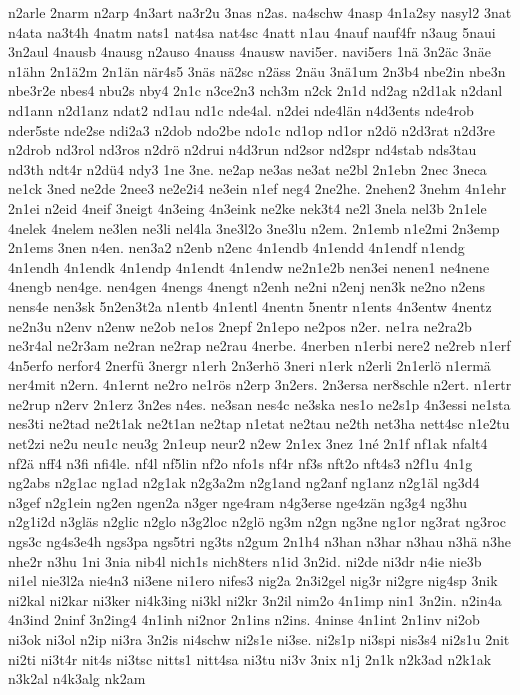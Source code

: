 {n2arle
2narm
n2arp
4n3art
na3r2u
3nas
n2as.
na4schw
4nasp
4n1a2sy
nasyl2
3nat
n4ata
na3t4h
4natm
nats1
nat4sa
nat4sc
4natt
n1au
4nauf
nauf4fr
n3aug
5naui
3n2aul
4nausb
4nausg
n2auso
4nauss
4nausw
navi5er.
navi5ers
1nä
3n2äc
3näe
n1ähn
2n1ä2m
2n1än
när4s5
3näs
nä2sc
n2äss
2näu
3nä1um
2n3b4
nbe2in
nbe3n
nbe3r2e
nbes4
nbu2s
nby4
2n1c
n3ce2n3
nch3m
n2ck
2n1d
nd2ag
n2d1ak
n2danl
nd1ann
n2d1anz
ndat2
nd1au
nd1c
nde4al.
n2dei
nde4län
n4d3ents
nde4rob
nder5ste
nde2se
ndi2a3
n2dob
ndo2be
ndo1c
nd1op
nd1or
n2dö
n2d3rat
n2d3re
n2drob
nd3rol
nd3ros
n2drö
n2drui
n4d3run
nd2sor
nd2spr
nd4stab
nds3tau
nd3th
ndt4r
n2dü4
ndy3
1ne
3ne.
ne2ap
ne3as
ne3at
ne2bl
2n1ebn
2nec
3neca
ne1ck
3ned
ne2de
2nee3
ne2e2i4
ne3ein
n1ef
neg4
2ne2he.
2nehen2
3nehm
4n1ehr
2n1ei
n2eid
4neif
3neigt
4n3eing
4n3eink
ne2ke
nek3t4
ne2l
3nela
nel3b
2n1ele
4nelek
4nelem
ne3len
ne3li
nel4la
3ne3l2o
3ne3lu
n2em.
2n1emb
n1e2mi
2n3emp
2n1ems
3nen
n4en.
nen3a2
n2enb
n2enc
4n1endb
4n1endd
4n1endf
n1endg
4n1endh
4n1endk
4n1endp
4n1endt
4n1endw
ne2n1e2b
nen3ei
nenen1
ne4nene
4nengb
nen4ge.
nen4gen
4nengs
4nengt
n2enh
ne2ni
n2enj
nen3k
ne2no
n2ens
nens4e
nen3sk
5n2en3t2a
n1entb
4n1entl
4nentn
5nentr
n1ents
4n3entw
4nentz
ne2n3u
n2env
n2enw
ne2ob
ne1os
2nepf
2n1epo
ne2pos
n2er.
ne1ra
ne2ra2b
ne3r4al
ne2r3am
ne2ran
ne2rap
ne2rau
4nerbe.
4nerben
n1erbi
nere2
ne2reb
n1erf
4n5erfo
nerfor4
2nerfü
3nergr
n1erh
2n3erhö
3neri
n1erk
n2erli
2n1erlö
n1ermä
ner4mit
n2ern.
4n1ernt
ne2ro
ne1rös
n2erp
3n2ers.
2n3ersa
ner8schle
n2ert.
n1ertr
ne2rup
n2erv
2n1erz
3n2es
n4es.
ne3san
nes4c
ne3ska
nes1o
ne2s1p
4n3essi
ne1sta
nes3ti
ne2tad
ne2t1ak
ne2t1an
ne2tap
n1etat
ne2tau
ne2th
net3ha
nett4sc
n1e2tu
net2zi
ne2u
neu1c
neu3g
2n1eup
neur2
n2ew
2n1ex
3nez
1né
2n1f
nf1ak
nfalt4
nf2ä
nff4
n3fi
nfi4le.
nf4l
nf5lin
nf2o
nfo1s
nf4r
nf3s
nft2o
nft4s3
n2f1u
4n1g
ng2abs
n2g1ac
ng1ad
n2g1ak
n2g3a2m
n2g1and
ng2anf
ng1anz
n2g1äl
ng3d4
n3gef
n2g1ein
ng2en
ngen2a
n3ger
nge4ram
n4g3erse
nge4zän
ng3g4
ng3hu
n2g1i2d
n3gläs
n2glic
n2glo
n3g2loc
n2glö
ng3m
n2gn
ng3ne
ng1or
ng3rat
ng3roc
ngs3c
ng4s3e4h
ngs3pa
ngs5tri
ng3ts
n2gum
2n1h4
n3han
n3har
n3hau
n3hä
n3he
nhe2r
n3hu
1ni
3nia
nib4l
nich1s
nich8ters
n1id
3n2id.
ni2de
ni3dr
n4ie
nie3b
ni1el
nie3l2a
nie4n3
ni3ene
ni1ero
nifes3
nig2a
2n3i2gel
nig3r
ni2gre
nig4sp
3nik
ni2kal
ni2kar
ni3ker
ni4k3ing
ni3kl
ni2kr
3n2il
nim2o
4n1imp
nin1
3n2in.
n2in4a
4n3ind
2ninf
3n2ing4
4n1inh
ni2nor
2n1ins
n2ins.
4ninse
4n1int
2n1inv
ni2ob
ni3ok
ni3ol
n2ip
ni3ra
3n2is
ni4schw
ni2s1e
ni3se.
ni2s1p
ni3spi
nis3s4
ni2s1u
2nit
ni2ti
ni3t4r
nit4s
ni3tsc
nitts1
nitt4sa
ni3tu
ni3v
3nix
n1j
2n1k
n2k3ad
n2k1ak
n3k2al
n4k3alg
nk2am
}
